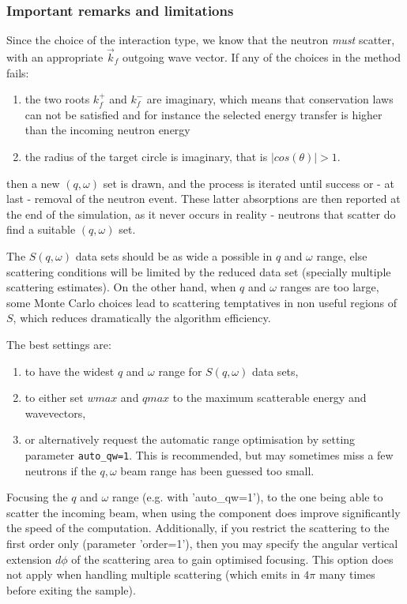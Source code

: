 \subsubsection{Important remarks and limitations}

Since the choice of the interaction type, we know that the neutron \emph{must} scatter, with an appropriate $\vec k_f$ outgoing wave vector. If any of the choices in the method fails:
\begin{enumerate}
\item the two roots $k_f^+$ and $k_f^-$ are imaginary, which means that conservation laws can not be satisfied and for instance the selected energy transfer is higher than the incoming neutron energy
\item the radius of the target circle is imaginary, that is $|cos(\theta)| > 1$.
\end{enumerate}
then a new $(q, \omega)$ set is drawn, and the process is iterated until success or - at last - removal of the neutron event. These latter absorptions are then reported at the end of the simulation, as it never occurs in reality - neutrons that scatter do find a suitable $(q, \omega)$ set.

The $S(q,\omega)$ data sets should be as wide a possible in $q$ and $\omega$ range, else scattering conditions will be limited by the reduced data set (specially multiple scattering estimates). On the other hand, when $q$ and $\omega$ ranges are too large, some Monte Carlo choices lead to scattering temptatives in non useful regions of $S$, which reduces dramatically the algorithm efficiency.

The best settings are:
\begin{enumerate}
\item to have the widest $q$ and $\omega$ range for $S(q,\omega)$ data sets,
\item to either set $wmax$ and $qmax$ to the maximum scatterable energy and wavevectors,
\item or alternatively request the automatic range optimisation by setting parameter \verb+auto_qw=1+. This is recommended, but may sometimes miss a few neutrons if the $q,\omega$ beam range has been guessed too small.
\end{enumerate}

Focusing the $q$ and $\omega$ range (e.g. with 'auto\_qw=1'), to the one being able to scatter the incoming beam, when using the component does improve significantly the speed of the computation. Additionally, if you restrict the scattering to the first order only (parameter 'order=1'), then you may specify the angular vertical extension $d\phi$ of the scattering area to gain optimised focusing. This option does not apply when handling multiple scattering (which emits in $4\pi$ many times before exiting the sample).

